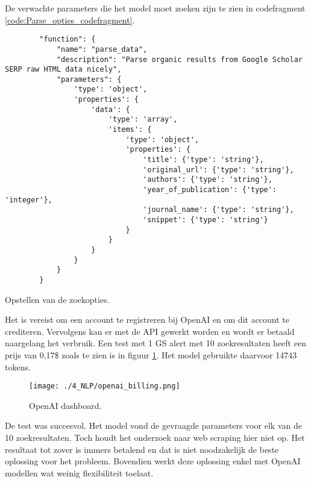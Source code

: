 De verwachte parameters die het model moet zoeken zijn te zien in codefragment \ref{code:Parse_opties_codefragment}.\\
\begin{listing}[h!]
    \begin{verbatim}
        "function": {
            "name": "parse_data",
            "description": "Parse organic results from Google Scholar SERP raw HTML data nicely",
            "parameters": {
                'type': 'object',
                'properties': {
                    'data': {
                        'type': 'array',
                        'items': {
                            'type': 'object',
                            'properties': {
                                'title': {'type': 'string'},
                                'original_url': {'type': 'string'},
                                'authors': {'type': 'string'},
                                'year_of_publication': {'type': 'integer'},
                                'journal_name': {'type': 'string'},
                                'snippet': {'type': 'string'}
                            }
                        }
                    }
                }
            }
        }
    \end{verbatim}
    \caption[OpenAI parameters]{Opstellen van de zoekopties.}
    \label{code:Parse_opties_codefragment}
\end{listing}
Het is vereist om een account te registreren bij OpenAI en om dit account te crediteren. Vervolgens kan er met de API gewerkt worden en wordt er betaald naargelang het verbruik.
Een test met 1 GS alert met 10 zoekresultaten heeft een prijs van 0,17\$ zoals te zien is in figuur \ref{fig:OpenAI_dashboard}. Het model gebruikte daarvoor 14743 tokens. 
\begin{figure}[h!]
    \centering
    \texttt{[image: ./4\_NLP/openai\_billing.png]}
    \caption[OpenAI dashboard.]{\label{fig:OpenAI_dashboard}OpenAI dashboard.}
\end{figure}
De test was succesvol. Het model vond de gevraagde parameters voor elk van de 10 zoekresultaten. Toch houdt het onderzoek naar web scraping hier niet op. Het resultaat tot zover is immers betalend en dat is niet noodzakelijk de beste oplossing voor het probleem. Bovendien werkt deze oplossing enkel met OpenAI modellen wat weinig flexibiliteit toelaat.

